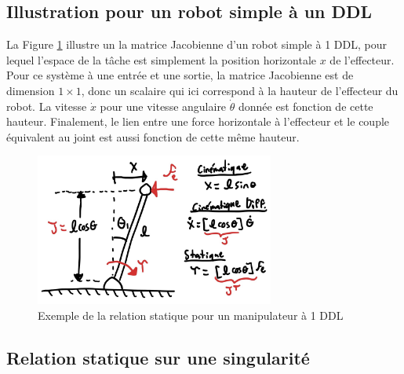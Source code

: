 \subsection{Illustration pour un robot simple à un DDL}

La Figure \ref{fig:static1dofexemple} illustre un la matrice Jacobienne d'un robot simple à 1 DDL, pour lequel l'espace de la tâche est simplement la position horizontale $x$ de l'effecteur. Pour ce système à une entrée et une sortie, la matrice Jacobienne est de dimension $1\times1$, donc un scalaire qui ici correspond à la hauteur de l'effecteur du robot. La vitesse $\dot{x}$ pour une vitesse angulaire $\dot{\theta}$ donnée est fonction de cette hauteur. Finalement, le lien entre une force horizontale à l'effecteur et le couple équivalent au joint est aussi fonction de cette même hauteur. 

\begin{figure}[H]
	\centering
		\includegraphics[width=0.70\textwidth]{fig/static1dofexemple.jpg}
	\caption{Exemple de la relation statique pour un manipulateur à 1 DDL}
	\label{fig:static1dofexemple}
\end{figure}

\subsection{Relation statique sur une singularité}

